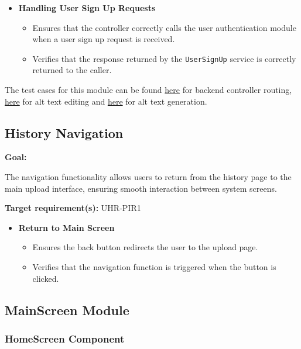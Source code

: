 \documentclass[12pt, titlepage]{article}
\begin{document}
\begin{itemize}
  \item \textbf{Handling User Sign Up Requests}
  \begin{itemize} 
    \item Ensures that the controller correctly calls the user authentication module when a user sign up request is received.
    \item Verifies that the response returned by the \texttt{UserSignUp} service is correctly returned to the caller.
\end{itemize}
\end{itemize}

The test cases for this module can be found \href{https://github.com/4G06-CAPSTONE-2025/Reading4All/blob/main/backend/tests/test_image_validation.py}{here} for backend controller routing, 
\href{https://github.com/4G06-CAPSTONE-2025/Reading4All/blob/main/backend/tests/test_edit_alt_text.py}{here} 
for alt text editing and \href{https://github.com/4G06-CAPSTONE-2025/Reading4All/blob/main/backend/tests/test_gen_alt_text.py}{here} for alt text generation. 

\subsection{History Navigation}

\textbf{Goal:}

The navigation functionality allows users to return from the history page to the
main upload interface, ensuring smooth interaction between system screens.

\textbf{Target requirement(s):} UHR-PIR1

\begin{itemize}

\item \textbf{Return to Main Screen}
\begin{itemize}
\item Ensures the back button redirects the user to the upload page.
\item Verifies that the navigation function is triggered when the button is clicked.
\end{itemize}

\end{itemize}
\subsection{MainScreen Module}

\subsubsection{HomeScreen Component}
\end{document}
